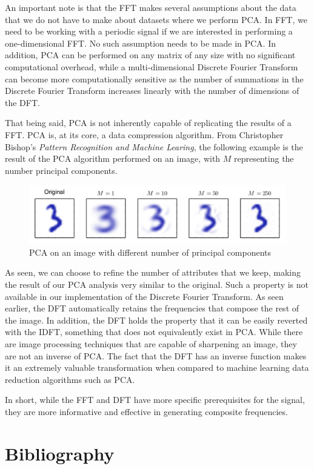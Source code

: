 \documentclass{amsproc}
\begin{document}
An important note is that the FFT makes several assumptions about the data that we do not have to make about datasets where we perform PCA. In FFT, we need to be working with a periodic signal if we are interested in performing a one-dimensional FFT. No such assumption needs to be made in PCA. In addition, PCA can be performed on any matrix of any size with no significant computational overhead, while a multi-dimensional Discrete Fourier Transform can become more computationally sensitive as the number of summations in the Discrete Fourier Transform increases linearly with the number of dimensions of the DFT.

That being said, PCA is not inherently capable of replicating the results of a FFT. PCA is, at its core, a data compression algorithm.  From Christopher Bishop's \textit{Pattern Recognition and Machine Learing}, the following example is the result of the PCA algorithm performed on an image, with $M$ representing the number principal components.

\begin{figure}[h]
	\includegraphics[scale=.5]{images/pca.png}
	\caption{PCA on an image with different number of principal components}
	\label{fig:pca}
\end{figure}

As seen, we can choose to refine the number of attributes that we keep, making the result of our PCA analysis very similar to the original. Such a property is not available in our implementation of the Discrete Fourier Transform. As seen earlier, the DFT automatically retains the frequencies that compose the rest of the image. In addition, the DFT holds the property that it can be easily reverted with the IDFT, something that does not equivalently exist in PCA. While there are image processing techniques that are capable of sharpening an image, they are not an inverse of PCA. The fact that the DFT has an inverse function makes it an extremely valuable transformation when compared to machine learning data reduction algorithms such as PCA.

In short, while the FFT and DFT have more specific prerequisites for the signal, they are more informative and effective in generating composite frequencies.

\newpage
\section{Bibliography}
\end{document}
